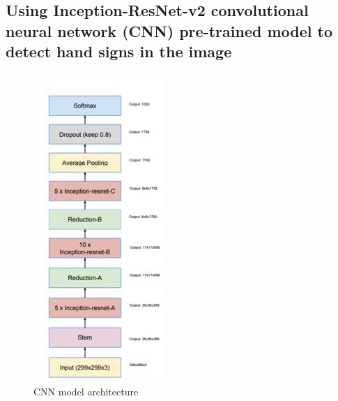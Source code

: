 \documentclass[12pt,a4paper]{report}
\begin{document}
\subsection{Using Inception-ResNet-v2 convolutional neural network (CNN) pre-trained model to detect hand signs in the image}
\begin{figure}[htbp]
	\centerline{\includegraphics[scale=0.5]{cnn.jpg}}
	\caption{CNN model architecture}
	\label{Cnn}
\end{figure}
\end{document}

